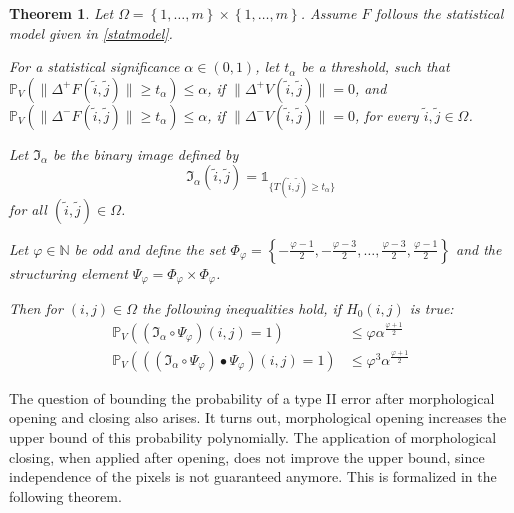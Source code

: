 \documentclass[a4paper,12pt]{article}
\newcommand{\norm}[1]{\lVert#1\rVert}
\theoremstyle{plain}
\newtheorem{theorem}{Theorem}[section]
\theoremstyle{definition}
\begin{document}
\begin{theorem}
	Let $\Omega = \left\{ 1, \dots, m \right\} \times \left\{ 1, \dots, m \right\}$. Assume $F$ follows the statistical model given in \eqref{statmodel}.
	
	For a statistical significance $\alpha \in (0, 1)$, let $t_\alpha$ be a threshold, such that $\mathbb{P}_V( \norm{\Delta^+ F(\tilde{i}, \tilde{j})} \geq t_\alpha ) \leq \alpha$, if $\norm{\Delta^+ V(\tilde{i}, \tilde{j})} = 0$, and $\mathbb{P}_V( \norm{\Delta^- F(\tilde{i}, \tilde{j})} \geq t_\alpha ) \leq \alpha$, if $\norm{\Delta^- V(\tilde{i}, \tilde{j})} = 0$, for every $\tilde{i}, \tilde{j} \in \Omega$.
	
	Let $\mathfrak{I}_\alpha$ be the binary image defined by
	\begin{equation*}
	\mathfrak{I}_\alpha(\tilde{i}, \tilde{j}) = \mathds{1}_{ \{ T(\tilde{i}, \tilde{j}) \geq t_\alpha \} }
	\end{equation*}
	for all $(\tilde{i}, \tilde{j}) \in \Omega$.
	
	Let $\varphi \in \mathbb{N}$ be odd and define the set $\Phi_\varphi = \left\{ -\frac{\varphi - 1}{2}, -\frac{\varphi - 3}{2}, \dots, \frac{\varphi - 3}{2}, \frac{\varphi - 1}{2} \right\}$ and the structuring element $\Psi_\varphi = \Phi_\varphi \times \Phi_\varphi$.
	
	Then for $(i, j) \in \Omega$ the following inequalities hold, if $H_0(i, j)$ is true:
	\begin{align}
		\mathbb{P}_V\left( (\mathfrak{I}_\alpha \circ \Psi_\varphi)(i, j) = 1 \right) &\leq \varphi \alpha^{\frac{\varphi + 1}{2}} \label{ineq: introtypeIopening} \\
		\mathbb{P}_V\left( ((\mathfrak{I}_\alpha \circ \Psi_\varphi) \bullet \Psi_\varphi)(i, j) = 1 \right) &\leq \varphi^3 \alpha^{\frac{\varphi + 1}{2}} \label{ineq: introtypeIclosing}
	\end{align}
\end{theorem}

The question of bounding the probability of a type II error after morphological opening and closing also arises. It turns out, morphological opening increases the upper bound of this probability polynomially. The application of morphological closing, when applied after opening, does not improve the upper bound, since independence of the pixels is not guaranteed anymore. This is formalized in the following theorem.
\end{document}
